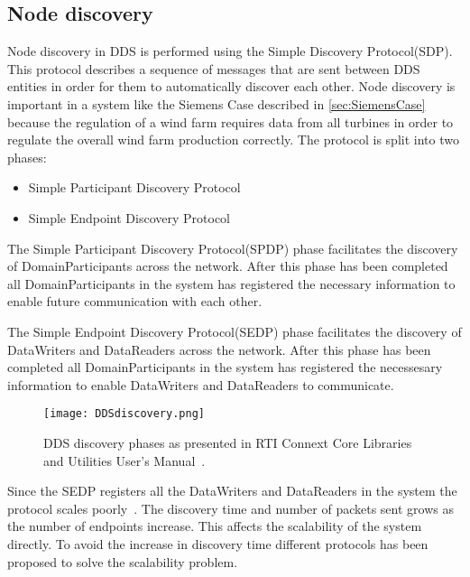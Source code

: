 \subsection{Node discovery}
Node discovery in DDS is performed using the Simple Discovery Protocol(SDP).
This protocol describes a sequence of messages that are sent between DDS entities in order for them to automatically discover each other.
Node discovery is important in a system like the Siemens Case described in \cref{sec:SiemensCase} because the regulation of a wind farm requires data from all turbines in order to regulate the overall wind farm production correctly.
The protocol is split into two phases:

\begin{itemize}
	\item Simple Participant Discovery Protocol
	\item Simple Endpoint Discovery Protocol
\end{itemize}

The Simple Participant Discovery Protocol(SPDP) phase facilitates the discovery of DomainParticipants across the network.
After this phase has been completed all DomainParticipants in the system has registered the necessary information to enable future communication with each other.

The Simple Endpoint Discovery Protocol(SEDP) phase facilitates the discovery of DataWriters and DataReaders across the network.
After this phase has been completed all DomainParticipants in the system has registered the necessesary information to enable DataWriters and DataReaders to communicate.

\begin{figure}
	\centering
	\texttt{[image: DDSdiscovery.png]} 
	\caption[DDS discovery phases]{
		\label{fig:DDSdiscovery} 
		\footnotesize{%
			DDS discovery phases as presented in RTI Connext Core Libraries and Utilities User's Manual~\cite{rtiConnextUsersManual}.
		}
	}
\end{figure}

Since the SEDP registers all the DataWriters and DataReaders in the system the protocol scales poorly~\cite{CFDP}. The discovery time and number of packets sent grows as the number of endpoints increase. This affects the scalability of the system directly. To avoid the increase in discovery time different protocols has been proposed to solve the scalability problem. 


